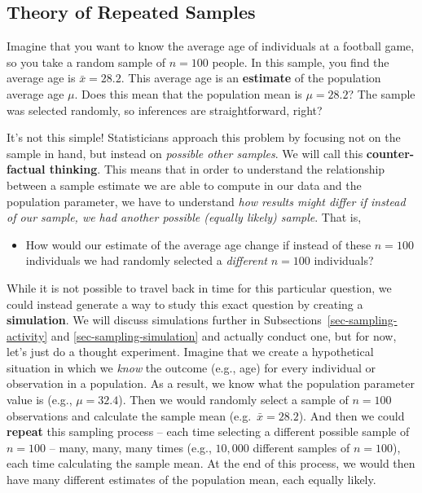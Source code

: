 \documentclass[
  letterpaper,
  DIV=11,
  numbers=noendperiod]{scrreprt}
\providecommand{\tightlist}{%
  \setlength{\itemsep}{0pt}\setlength{\parskip}{0pt}}\usepackage{longtable,booktabs,array}
\theoremstyle{definition}
\theoremstyle{remark}
\begin{document}
\hypertarget{sec-theory}{%
\subsection{Theory of Repeated Samples}\label{sec-theory}}

Imagine that you want to know the average age of individuals at a
football game, so you take a random sample of \(n=100\) people. In this
sample, you find the average age is \(\bar{x} = 28.2\). This average age
is an \textbf{estimate} of the population average age \(\mu\). Does this
mean that the population mean is \(\mu = 28.2\)? The sample was selected
randomly, so inferences are straightforward, right?

It's not this simple! Statisticians approach this problem by focusing
not on the sample in hand, but instead on \emph{possible other samples}.
We will call this \textbf{counter-factual thinking}. This means that in
order to understand the relationship between a sample estimate we are
able to compute in our data and the population parameter, we have to
understand \emph{how results might differ if instead of our sample, we
had another possible (equally likely) sample}. That is,

\begin{itemize}
\tightlist
\item
  How would our estimate of the average age change if instead of these
  \(n = 100\) individuals we had randomly selected a \emph{different}
  \(n = 100\) individuals?
\end{itemize}

While it is not possible to travel back in time for this particular
question, we could instead generate a way to study this exact question
by creating a \textbf{simulation}. We will discuss simulations further
in Subsections~\ref{sec-sampling-activity} and
\ref{sec-sampling-simulation} and actually conduct one, but for now,
let's just do a thought experiment. Imagine that we create a
hypothetical situation in which we \emph{know} the outcome (e.g., age)
for every individual or observation in a population. As a result, we
know what the population parameter value is (e.g., \(\mu = 32.4\)). Then
we would randomly select a sample of \(n = 100\) observations and
calculate the sample mean (e.g.~\(\bar{x} = 28.2\)). And then we could
\textbf{repeat} this sampling process -- each time selecting a different
possible sample of \(n = 100\) -- many, many, many times (e.g.,
\(10,000\) different samples of \(n = 100\)), each time calculating the
sample mean. At the end of this process, we would then have many
different estimates of the population mean, each equally likely.
\end{document}
